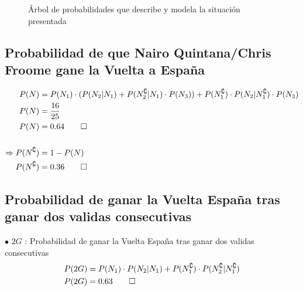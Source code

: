 \documentclass[paper=letterpaper]{article}
\begin{document}
\begin{figure}[t]
\caption{Árbol de probabilidades que describe y modela la situación presentada}
\label{Fig:F3}
\end{figure}

\subsection{Probabilidad de que Nairo Quintana/Chris Froome gane la Vuelta a España}
\begin{alignat*}{2}
P(N) &= P(N_1) \cdot (P(N_2 \vert N_1) + P(N_2^{\complement} \vert N_1) \cdot P(N_3)) + P(N_1^{\complement}) \cdot P(N_2 \vert N_1^{\complement}) \cdot P(N_3) \\ 
P(N) &= \frac{16}{25} \\
P(N) &= 0.64 \qed \\ \\
\Rightarrow P(N^{\complement}) &= 1 - P(N) \\
            P(N^{\complement}) &= 0.36 \qed
\end{alignat*}

\subsection{Probabilidad de ganar la Vuelta España tras ganar dos validas consecutivas}
$\bullet$ $2G$ : Probabilidad de ganar la Vuelta España tras ganar dos validas consecutivas 
\\
\begin{alignat*}{2}
P(2G) &= P(N_1) \cdot P(N_2 \vert N_1) + P(N_1^{\complement}) \cdot P(N_2^{\complement} \vert N_1^{\complement}) \\
P(2G) &= 0.63 \qed
\end{alignat*}
\end{document}
